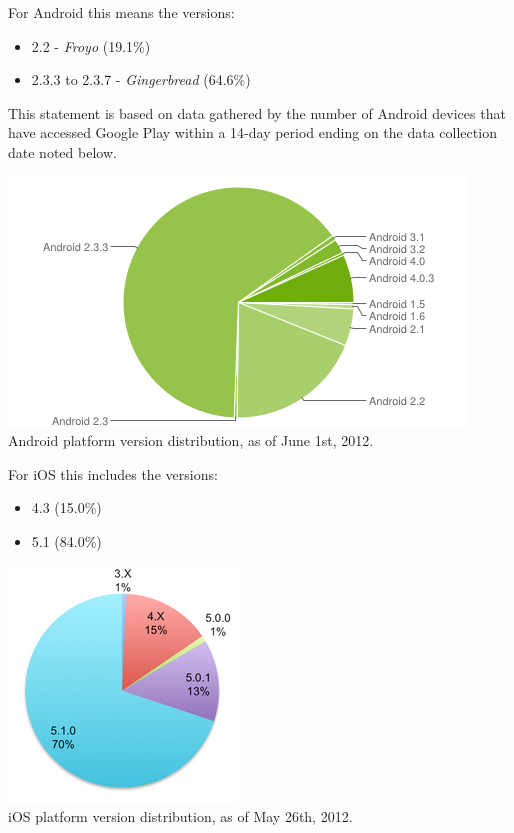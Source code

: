 \noindent For Android this means the versions:
\begin{itemize}
\item 2.2 - \emph{Froyo} (19.1\%)
\item 2.3.3 to 2.3.7 - \emph{Gingerbread} (64.6\%)
\end{itemize}
This statement is based on data gathered by the number of Android devices that have accessed Google Play within a 14-day period ending on the data collection date noted below.
\begin{centering}
\includegraphics[scale=0.35]{images/androidversionchart.png}\\{Android platform version distribution, as of June 1st, 2012.\cite{GoogleAndroid2012}}\\
\end{centering}

\noindent For iOS this includes the versions:
\begin{itemize}
\item 4.3 (15.0\%)
\item 5.1 (84.0\%)
\end{itemize}
\begin{centering}
\includegraphics[scale=0.35]{images/iosversionchart.png}\\{iOS platform version distribution, as of May 26th, 2012.\cite{Sylvain2012}}\\
\end{centering}



